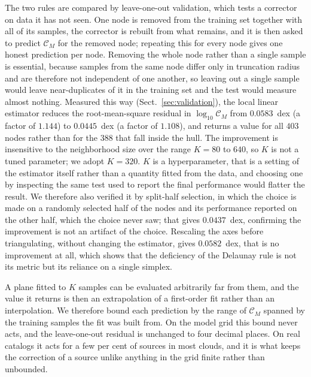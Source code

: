 \documentclass{aa}
\newcommand{\CM}{\mathcal{C}_{M}}
\begin{document}
The two rules are compared by leave-one-out validation, which tests a
corrector on data it has not seen. One node is removed from the training set
together with all of its samples, the corrector is rebuilt from what
remains, and it is then asked to predict $\CM$ for the removed node;
repeating this for every node gives one honest prediction per node. Removing
the whole node rather than a single sample is essential, because samples
from the same node differ only in truncation radius and are therefore not
independent of one another, so leaving out a single sample would leave
near-duplicates of it in the training set and the test would measure almost
nothing. Measured this way (Sect.~\ref{sec:validation}), the local linear
estimator reduces the root-mean-square residual in $\log_{10}\CM$
from $0.0583$~dex (a factor of $1.144$) to $0.0445$~dex (a factor of
$1.108$), and returns a value for all $403$ nodes rather than for the $388$
that fall inside the hull. The improvement is insensitive to the
neighborhood size over the range $K=80$ to $640$, so $K$ is not a tuned
parameter; we adopt $K=320$. $K$ is a hyperparameter, that is a setting of
the estimator itself rather than a quantity fitted from the data, and
choosing one by inspecting the same test used to report the final
performance would flatter the result. We therefore also verified it by
split-half selection, in which the choice is made on a randomly selected
half of the nodes and its performance reported on the other half, which the
choice never saw; that gives $0.0437$~dex, confirming the improvement is not
an artifact of the choice. Rescaling the axes before triangulating,
without changing the estimator, gives $0.0582$~dex, that is no improvement
at all, which shows that the deficiency of the Delaunay rule is not its
metric but its reliance on a single simplex.

A plane fitted to $K$ samples can be evaluated arbitrarily far from them,
and the value it returns is then an extrapolation of a first-order fit
rather than an interpolation. We therefore bound each prediction by the
range of $\CM$ spanned by the training samples the fit was built from. On
the model grid this bound never acts, and the leave-one-out residual is
unchanged to four decimal places. On real catalogs it acts for a few per
cent of sources in most clouds, and it is what keeps the correction of a
source unlike anything in the grid finite rather than unbounded.
\end{document}

